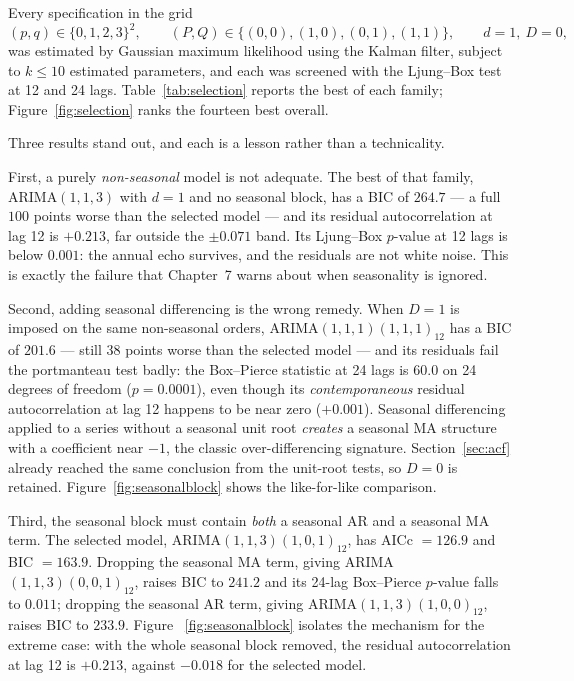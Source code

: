 Every specification in the grid
\begin{equation}
(p,q)\in\{0,1,2,3\}^2,\qquad (P,Q)\in\{(0,0),(1,0),(0,1),(1,1)\},\qquad d=1,\ D=0,
\end{equation}
was estimated by Gaussian maximum likelihood using the Kalman filter, subject to
$k\le 10$ estimated parameters, and each was screened with the Ljung--Box test at
12 and 24 lags. Table~\ref{tab:selection} reports the best of each family;
Figure~\ref{fig:selection} ranks the fourteen best overall.



Three results stand out, and each is a lesson rather than a technicality.

First, a purely \emph{non-seasonal} model is not adequate. The best of that family,
ARIMA$(1,1,3)$ with $d=1$ and no seasonal block, has a BIC of $264.7$ --- a full
$100$ points worse than the selected model --- and its residual autocorrelation at
lag 12 is $+0.213$, far outside the $\pm0.071$ band. Its Ljung--Box $p$-value at
12 lags is below $0.001$: the annual echo survives, and the residuals are not white
noise. This is exactly the failure that Chapter~7 warns about when seasonality is
ignored.

Second, adding seasonal differencing is the wrong remedy. When $D=1$ is imposed
on the same non-seasonal orders, ARIMA$(1,1,1)(1,1,1)_{12}$ has a BIC of $201.6$
--- still $38$ points worse than the selected model --- and its residuals fail the
portmanteau test badly: the Box--Pierce statistic at 24 lags is $60.0$ on 24
degrees of freedom ($p=0.0001$), even though its \emph{contemporaneous} residual
autocorrelation at lag 12 happens to be near zero ($+0.001$). Seasonal differencing
applied to a series without a seasonal unit root \emph{creates} a seasonal MA
structure with a coefficient near $-1$, the classic over-differencing signature.
Section~\ref{sec:acf} already reached the same conclusion from the unit-root tests,
so $D=0$ is retained. Figure~\ref{fig:seasonalblock} shows the like-for-like
comparison.

Third, the seasonal block must contain \emph{both} a seasonal AR and a seasonal MA
term. The selected model, ARIMA$(1,1,3)(1,0,1)_{12}$, has AICc $=126.9$ and BIC
$=163.9$. Dropping the seasonal MA term, giving ARIMA$(1,1,3)(0,0,1)_{12}$, raises
BIC to $241.2$ and its 24-lag Box--Pierce $p$-value falls to $0.011$; dropping the
seasonal AR term, giving ARIMA$(1,1,3)(1,0,0)_{12}$, raises BIC to $233.9$. Figure
~\ref{fig:seasonalblock} isolates the mechanism for the extreme case: with the whole
seasonal block removed, the residual autocorrelation at lag 12 is $+0.213$, against
$-0.018$ for the selected model.

